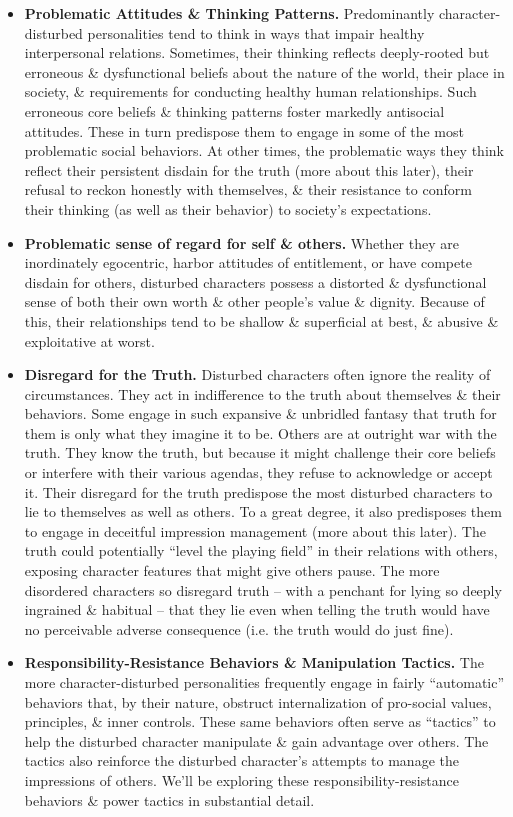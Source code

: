 \documentclass{article}
\numberwithin{equation}{section}
\begin{document}
\begin{itemize}
	\item \textbf{Problematic Attitudes \& Thinking Patterns.} Predominantly character-disturbed personalities tend to think in ways that impair healthy interpersonal relations. Sometimes, their thinking reflects deeply-rooted but erroneous \& dysfunctional beliefs about the nature of the world, their place in society, \& requirements for conducting healthy human relationships. Such erroneous core beliefs \& thinking patterns foster markedly antisocial attitudes. These in turn predispose them to engage in some of the most problematic social behaviors. At other times, the problematic ways they think reflect their persistent disdain for the truth (more about this later), their refusal to reckon honestly with themselves, \& their resistance to conform their thinking (as well as their behavior) to society's expectations.
	\item \textbf{Problematic sense of regard for self \& others.} Whether they are inordinately egocentric, harbor attitudes of entitlement, or have compete disdain for others, disturbed characters possess a distorted \& dysfunctional sense of both their own worth \& other people's value \& dignity. Because of this, their relationships tend to be shallow \& superficial at best, \& abusive \& exploitative at worst.
	\item \textbf{Disregard for the Truth.} Disturbed characters often ignore the reality of circumstances. They act in indifference to the truth about themselves \& their behaviors. Some engage in such expansive \& unbridled fantasy that truth for them is only what they imagine it to be. Others are at outright war with the truth. They know the truth, but because it might challenge their core beliefs or interfere with their various agendas, they refuse to acknowledge or accept it. Their disregard for the truth predispose the most disturbed characters to lie to themselves as well as others. To a great degree, it also predisposes them to engage in deceitful impression management (more about this later). The truth could potentially ``level the playing field'' in their relations with others, exposing character features that might give others pause. The more disordered characters so disregard truth -- with a penchant for lying so deeply ingrained \& habitual -- that they lie even when telling the truth would have no perceivable adverse consequence (i.e. the truth would do just fine).
	\item \textbf{Responsibility-Resistance Behaviors \& Manipulation Tactics.} The more character-disturbed personalities frequently engage in fairly ``automatic'' behaviors that, by their nature, obstruct internalization of pro-social values, principles, \& inner controls. These same behaviors often serve as ``tactics'' to help the disturbed character manipulate \& gain advantage over others. The tactics also reinforce the disturbed character's attempts to manage the impressions of others. We'll be exploring these responsibility-resistance behaviors \& power tactics in substantial detail.

\end{itemize}
\end{document}
